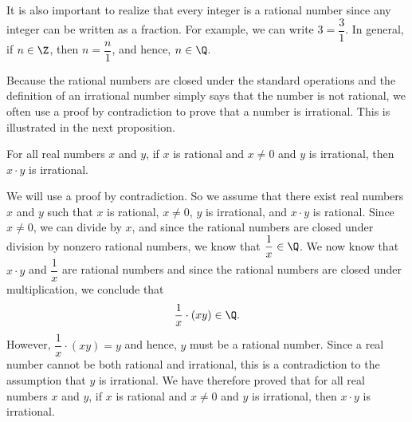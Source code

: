 It is also important to realize that every integer is a rational number since any integer can be written as a fraction.  For example, we can write $3 = \dfrac{3}{1}$.  In general, if $n \in \Z$, then $n = \dfrac{n}{1}$, and hence, $n \in \Q$.

Because the rational numbers are closed under the standard operations and the definition of an irrational number simply says that the number is not rational, we often use a proof by contradiction to prove that a number is irrational.  This is illustrated in the next proposition.

\begin{proposition}  For all real numbers $x$ and $y$, if $x$ is rational and $x \ne 0$ and $y$ is irrational, then $x \cdot y$ is irrational.
\end{proposition}

\begin{myproof}
We will use a proof by contradiction.  So we assume that there exist real numbers $x$ and $y$ such that $x$ is rational, $x \ne 0$,  $y$ is irrational, and $x \cdot y$ is rational.  Since $x \ne 0$, we can divide by $x$, and since the rational numbers are closed under division by nonzero rational numbers, we know that $\dfrac{1}{x} \in \Q$.  We now know that $x \cdot y$ and $\dfrac{1}{x}$ are rational numbers and since the rational numbers are closed under multiplication, we conclude that
\[
\frac{1}{x} \cdot \left( xy \right) \in \Q.
\]
However, $\dfrac{1}{x} \cdot \left( xy \right) = y$ and hence, $y$ must be a rational number.  Since a real number cannot be both rational and irrational, this is a contradiction to the assumption that $y$ is irrational.  We have therefore proved that for all real numbers $x$ and $y$, if $x$ is rational and $x \ne 0$ and $y$ is irrational, then $x \cdot y$ is irrational.
\end{myproof}

\hbreak
\endinput

